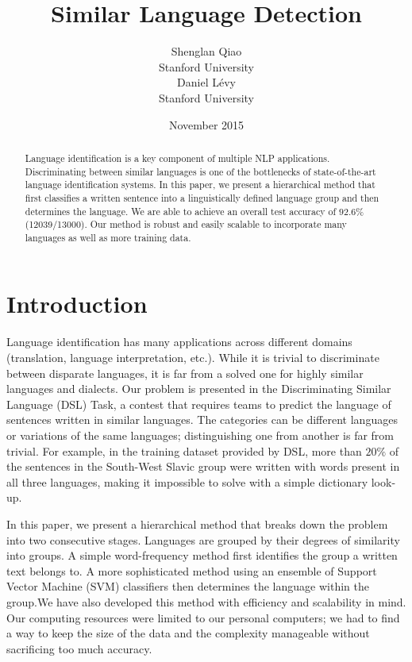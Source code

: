 \documentclass{article}
\title{Similar Language Detection}
\author{Shenglan Qiao \\
Stanford University\\
\And
Daniel L\'{e}vy \\
Stanford University\\
}
\date{November 2015}
\begin{document}
\vspace{-2cm}

\maketitle

\begin{abstract}
Language identification is a key component of multiple NLP applications. Discriminating between similar languages is one of the bottlenecks of state-of-the-art language identification systems. In this paper, we present a hierarchical method that first classifies a written sentence into a linguistically defined language group and then determines the language. We are able to achieve an overall test accuracy of $92.6\%$ (12039/13000). Our method is robust and easily scalable to incorporate many languages as well as more training data.
\end{abstract}


\section{Introduction}

Language identification has many applications across different domains (translation, language interpretation, etc.). While it is trivial to discriminate between disparate languages, it is far from a solved one for highly similar languages and dialects. Our problem is presented in the Discriminating Similar Language (DSL) Task, a contest that requires teams to predict the language of sentences written in similar languages. The categories can be different languages or variations of the same languages; distinguishing one from another is far from trivial. For example, in the training dataset provided by DSL, more than $20\%$ of the sentences in the South-West Slavic group were written with words present in all three languages, making it impossible to solve with a simple dictionary look-up.

In this paper, we present a hierarchical method that breaks down the problem into two consecutive stages. Languages are grouped by their degrees of similarity into groups. A simple word-frequency method first identifies the group a written text belongs to. A more sophisticated method using an ensemble of Support Vector Machine (SVM) classifiers then determines the language within the group.We have also developed this method with efficiency and scalability in mind. Our computing resources were limited to our personal computers; we had to find a way to keep the size of the data and the complexity manageable without sacrificing too much accuracy.
\end{document}
